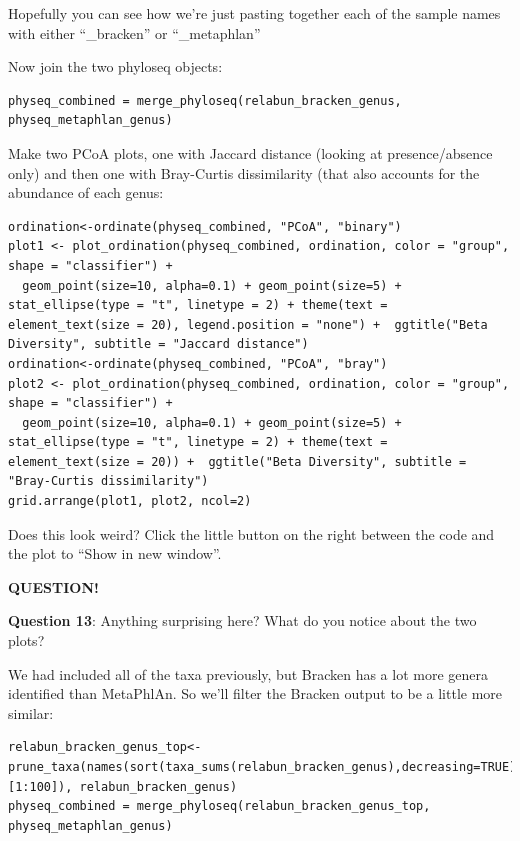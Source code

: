 \documentclass[
]{book}
\newenvironment{bluebox}{
  \definecolor{shadecolor}{RGB}{172, 210, 237}
  \color{white}
  \begin{shaded}}
 {\end{shaded}}
\begin{document}
Hopefully you can see how we're just pasting together each of the sample names with either ``\_bracken'' or ``\_metaphlan''

Now join the two phyloseq objects:

\begin{verbatim}
physeq_combined = merge_phyloseq(relabun_bracken_genus, physeq_metaphlan_genus)
\end{verbatim}

Make two PCoA plots, one with Jaccard distance (looking at presence/absence only) and then one with Bray-Curtis dissimilarity (that also accounts for the abundance of each genus:

\begin{verbatim}
ordination<-ordinate(physeq_combined, "PCoA", "binary")
plot1 <- plot_ordination(physeq_combined, ordination, color = "group", shape = "classifier") +
  geom_point(size=10, alpha=0.1) + geom_point(size=5) + stat_ellipse(type = "t", linetype = 2) + theme(text = element_text(size = 20), legend.position = "none") +  ggtitle("Beta Diversity", subtitle = "Jaccard distance")
ordination<-ordinate(physeq_combined, "PCoA", "bray")
plot2 <- plot_ordination(physeq_combined, ordination, color = "group", shape = "classifier") +
  geom_point(size=10, alpha=0.1) + geom_point(size=5) + stat_ellipse(type = "t", linetype = 2) + theme(text = element_text(size = 20)) +  ggtitle("Beta Diversity", subtitle = "Bray-Curtis dissimilarity")
grid.arrange(plot1, plot2, ncol=2)
\end{verbatim}

Does this look weird? Click the little button on the right between the code and the plot to ``Show in new window''.

\begin{bluebox}

\begin{center}
\textbf{QUESTION!}

\end{center}

\textbf{Question 13}: Anything surprising here? What do you notice about the two plots?

\end{bluebox}

We had included all of the taxa previously, but Bracken has a lot more genera identified than MetaPhlAn. So we'll filter the Bracken output to be a little more similar:

\begin{verbatim}
relabun_bracken_genus_top<-prune_taxa(names(sort(taxa_sums(relabun_bracken_genus),decreasing=TRUE)[1:100]), relabun_bracken_genus)
physeq_combined = merge_phyloseq(relabun_bracken_genus_top, physeq_metaphlan_genus)
\end{verbatim}
\end{document}
